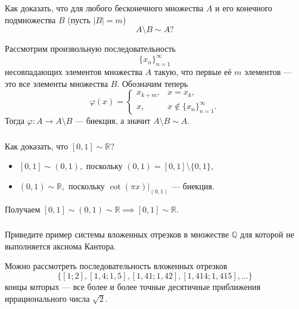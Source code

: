 \documentclass[11pt, a5paper]{article}
\newenvironment{note}[1]{\subsubsection{}}{}
\newenvironment{cloze}[2][\ldots]{\begin{leftbar}}{\end{leftbar}}
\begin{document}
    \begin{note}{d7dc9d0004e9406e8bedb136412f6d07}
        Как доказать, что для любого бесконечного множества \( A \) и его конечного
        подмножества \( B \) (пусть \( |B| = m \)) \[
            A \setminus B \sim  A?
        \]

        \begin{cloze}{1}
            Рассмотрим произвольную последовательность \[
                \{ x_n \}_{n = 1} ^{\infty }
            \] несовпадающих элементов множества \( A \) такую, что первые её \( m \)
            элементов --- это все элементы множества \( B. \) Обозначим теперь \[
                \varphi(x) = \begin{cases}
                    x_{k + m}, & x = x_k, \\
                    x, & x \not\in \{ x_n \}_{n = 1}^{\infty }.
                \end{cases}
            \] Тогда \( \varphi : A \to A \setminus B \) --- биекция, а значит
            \( A \setminus B \sim A. \)
        \end{cloze}
    \end{note}

    \begin{note}{75dda33bf56f4c7dae2140052f8d6f52}
        Как доказать, что \( [0, 1] \sim \mathbb R  \)?

        \begin{cloze}{1}
            \begin{itemize}
                \item \( [0, 1] \sim (0, 1),  \) поскольку \( (0, 1) = [0, 1]
                    \setminus \{ 0, 1 \},  \)
                \item \( (0, 1) \sim \mathbb R, \)  поскольку \( \cot (\pi
                    x)|_{(0, 1)} \) --- биекция.
            \end{itemize}
            Получаем \( [0, 1] \sim (0, 1) \sim \mathbb R \implies [0, 1] \sim
            \mathbb R. \)
        \end{cloze}
    \end{note}

    \begin{note}{c8ec225de29d4338add7adcea48cc2a2}
        Приведите пример системы вложенных отрезков в множестве \( \mathbb Q  \)
        для которой не выполняется аксиома Кантора.

        \begin{cloze}{1}
            Можно рассмотреть последовательность вложенных отрезков \[
                \{ [1;2], [1{,}4;1{,}5], [1{,}41;1{,}42],
                    [1{,}414;1{,}415],\ldots \}
            \] концы которых --- все более и более точные десятичные приближения
            иррационального числа \( \sqrt{2}. \)
        \end{cloze}
    \end{note}
\end{document}

